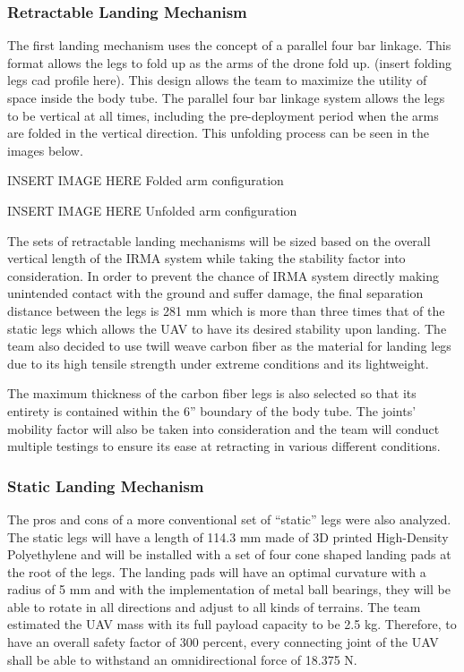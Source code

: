 		\subsubsection{Retractable Landing Mechanism}
			The first landing mechanism uses the concept of a parallel four bar linkage. This format allows the legs to fold up as the arms of the drone fold up. (insert folding legs cad profile here). This design allows the team to maximize the utility of space inside the body tube. The parallel four bar linkage system allows the legs to be vertical at all times, including the pre-deployment period when the arms are folded in the vertical direction. This unfolding process can be seen in the images below.

            INSERT IMAGE HERE
            Folded arm configuration

            INSERT IMAGE HERE
            Unfolded arm configuration

			The sets of retractable landing mechanisms will be sized based on the overall vertical length of the IRMA system while taking the stability factor into consideration. In order to prevent the chance of IRMA system directly making unintended contact with the ground and suffer damage, the final separation distance between the legs is 281 mm which is more than three times that of the static legs which allows the UAV to have its desired stability upon landing. The team also decided to use twill weave carbon fiber as the material for landing legs due to its high tensile strength under extreme conditions and its lightweight. 

            The maximum thickness of the carbon fiber legs is also selected so that its entirety is contained within the 6” boundary of the body tube. The joints’ mobility factor will also be taken into consideration and the team will conduct multiple testings to ensure its ease at retracting in various different conditions.


		\subsubsection{Static Landing Mechanism}
            The pros and cons of a more conventional set of “static” legs were also analyzed. The static legs will have a length of 114.3 mm made of 3D printed High-Density Polyethylene and will be installed with a set of four cone shaped landing pads at the root of the legs. The landing pads will have an optimal curvature with a radius of 5 mm and with the implementation of metal ball bearings, they will be able to rotate in all directions and adjust to all kinds of terrains. The team estimated the UAV mass with its full payload capacity to be 2.5 kg. Therefore, to have an overall safety factor of 300 percent, every connecting joint of the UAV shall be able to withstand an omnidirectional force of 18.375 N. 

